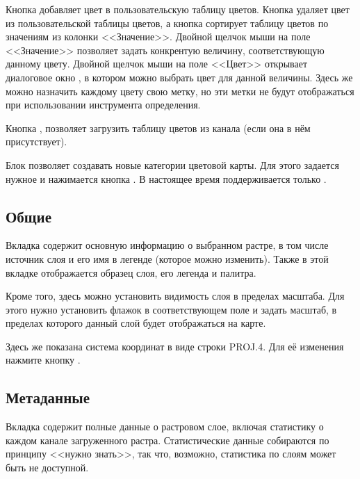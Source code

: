 Кнопка  добавляет цвет в пользовательскую таблицу
цветов. Кнопка  удаляет цвет из пользовательской
таблицы цветов, а кнопка  сортирует таблицу цветов
по значениям из колонки <<Значение>>. Двойной щелчок мыши на поле <<Значение>>
позволяет задать конкрентую величину, соответствующую данному цвету. Двойной
щелчок мыши на поле <<Цвет>> открывает диалоговое окно ,
в котором можно выбрать цвет для данной величины. Здесь же можно назначить
каждому цвету свою метку, но эти метки не будут отображаться при использовании
инструмента определения.

Кнопка ,
позволяет загрузить таблицу цветов из канала (если она в нём присутствует).

Блок  позволяет создавать
новые категории цветовой карты. Для этого задается нужное
 и нажимается кнопка
. В настоящее время поддерживается только
.

\subsection{Общие}\label{label_generaltab}

Вкладка  содержит основную информацию о выбранном растре,
в том числе источник слоя и его имя в легенде (которое можно изменить).
Также в этой вкладке отображается образец слоя, его легенда и палитра.

Кроме того, здесь можно установить видимость слоя в пределах
масштаба. Для этого нужно установить флажок в соответствующем поле и
задать масштаб, в пределах которого данный слой будет отображаться на
карте.

Здесь же показана система координат в виде строки PROJ.4. Для её изменения
нажмите кнопку .

\subsection{Метаданные}\label{label_metatab}

Вкладка  содержит полные данные о растровом слое,
включая статистику о каждом канале загруженного растра. Статистические
данные собираются по принципу <<нужно знать>>, так что, возможно,
статистика по слоям может быть не доступной.

